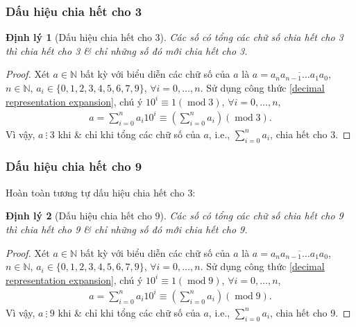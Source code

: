 \documentclass{article}
\numberwithin{equation}{section}
\newtheorem{theorem}{Định lý}[section]
\begin{document}
\subsubsection{Dấu hiệu chia hết cho 3}

\begin{theorem}[Dấu hiệu chia hết cho 3]
	Các số có tổng các chữ số chia hết cho 3 thì chia hết cho 3 \& chỉ những số đó mới chia hết cho 3.
\end{theorem}

\begin{proof}[Proof]
	Xét $a\in\mathbb{N}$ bất kỳ với biểu diễn các chữ số của $a$ là $a = \overline{a_na_{n-1}\ldots a_1a_0}$, $n\in\mathbb{N}$, $a_i\in\{0,1,2,3,4,5,6,7,9\}$, $\forall i = 0,\ldots,n$. Sử dụng công thức \eqref{decimal representation expansion}, chú ý $10^i\equiv 1(\operatorname{mod} 3)$, $\forall i = 0,\ldots,n$,
	\begin{align*}
		a = \sum_{i=0}^n a_i10^i\equiv\left(\sum_{i=0}^n a_i\right)(\operatorname{mod} 3).
	\end{align*}
	Vì vậy, $a\ \vdots\ 3$ khi \& chỉ khi tổng các chữ số của $a$, i.e., $\sum_{i=0}^n a_i$, chia hết cho 3.
\end{proof}

\subsubsection{Dấu hiệu chia hết cho 9}
Hoàn toàn tương tự dấu hiệu chia hết cho 3:

\begin{theorem}[Dấu hiệu chia hết cho 9]
	Các số có tổng các chữ số chia hết cho 9 thì chia hết cho 9 \& chỉ những số đó mới chia hết cho 9.
\end{theorem}

\begin{proof}[Proof]
	Xét $a\in\mathbb{N}$ bất kỳ với biểu diễn các chữ số của $a$ là $a = \overline{a_na_{n-1}\ldots a_1a_0}$, $n\in\mathbb{N}$, $a_i\in\{0,1,2,3,4,5,6,7,9\}$, $\forall i = 0,\ldots,n$. Sử dụng công thức \eqref{decimal representation expansion}, chú ý $10^i\equiv 1(\operatorname{mod} 9)$, $\forall i = 0,\ldots,n$,
	\begin{align*}
		a = \sum_{i=0}^n a_i10^i\equiv\left(\sum_{i=0}^n a_i\right)(\operatorname{mod} 9).
	\end{align*}
	Vì vậy, $a\ \vdots\ 9$ khi \& chỉ khi tổng các chữ số của $a$, i.e., $\sum_{i=0}^n a_i$, chia hết cho 9.
\end{proof}
\end{document}
